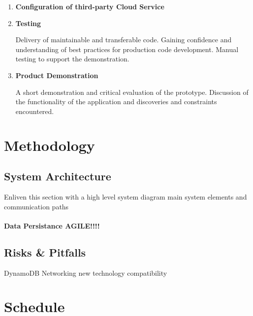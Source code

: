 \documentclass[a4paper, 11pt]{article}
\begin{document}
{\begin{enumerate}
   \item \textbf{Configuration of third-party Cloud Service}
   	\begin{flushleft}
 	\end{flushleft}
 
  \item \textbf{Testing}
   	\begin{flushleft}Delivery of maintainable and transferable code. Gaining confidence and understanding of best practices for production code development. Manual testing to support the demonstration. 
 	\end{flushleft}
 
 \item \textbf{Product Demonstration}
 	\begin{flushleft}A short demonstration and critical evaluation of the prototype. Discussion of the functionality of the application and discoveries and constraints encountered.
 	\end{flushleft}
\end{enumerate}
\clearpage


\section{Methodology}

\subsection{System Architecture}
Enliven this section with a high level system diagram
main system elements and communication paths 

\paragraph{Data Persistance AGILE!!!!}

\subsection{Risks \& Pitfalls}
DynamoDB
Networking
new technology 
compatibility
\clearpage

\section{Schedule}
}
\end{document}
